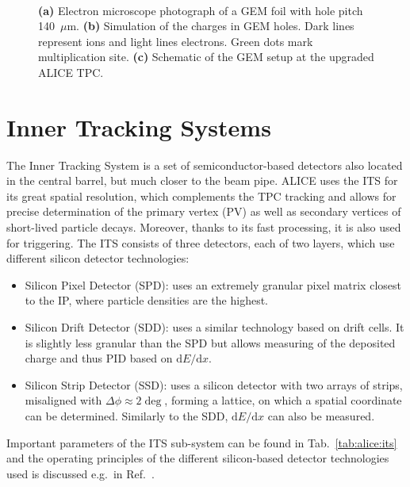 \begin{figure}[!h]
\hspace{1em}
\\
\caption{\textbf{(a)} Electron microscope photograph of a GEM foil with hole pitch 140~$\mu$m. \cite{kalweitProductionLightFlavor2012} \textbf{(b)} Simulation of the charges in GEM holes. Dark lines represent ions and light lines electrons. Green dots mark multiplication site. \textbf{(c)} Schematic of the GEM setup at the upgraded ALICE TPC. \cite{peskovTechnicalDesignReport2014}}
\label{fig:alice:gems}
\end{figure}

\section{Inner Tracking Systems}

The Inner Tracking System \cite{collaborationALICEExperimentCERN2008, alicecollaborationAlignmentALICEInner2010} is a set of semiconductor-based detectors also located in the central barrel, but much closer to the beam pipe. ALICE uses the ITS for its great spatial resolution, which complements the TPC tracking and allows for precise determination of the primary vertex (PV) as well as secondary vertices of short-lived particle decays. Moreover, thanks to its fast processing, it is also used for triggering. The ITS consists of three detectors, each of two layers, which use different silicon detector technologies:
\begin{itemize}
\item Silicon Pixel Detector (SPD): uses an extremely granular pixel matrix closest to the IP, where particle densities are the highest.
\item Silicon Drift Detector (SDD): uses a similar technology based on drift cells. It is slightly less granular than the SPD but allows measuring of the deposited charge and thus PID based on $\mathrm{d}E/\mathrm{d}x$.
\item Silicon Strip Detector (SSD): uses a silicon detector with two arrays of strips, misaligned with $\Delta\phi \approx 2 \deg$, forming a lattice, on which a spatial coordinate can be determined. Similarly to the SDD, $\mathrm{d}E/\mathrm{d}x$ can also be measured.
\end{itemize}
Important parameters of the ITS sub-system can be found in Tab.~\ref{tab:alice:its} and the operating principles of the different silicon-based detector technologies used is discussed e.g.\ in Ref.~\cite{krammerSiliconDetectorsHigh2015, masciocchiLectureNotesSemiconductor2017}.

